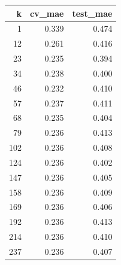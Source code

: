 \begin{tabular}{rrr}
\toprule
k & cv_mae & test_mae \\
\midrule
1 & 0.339 & 0.474 \\
12 & 0.261 & 0.416 \\
23 & 0.235 & 0.394 \\
34 & 0.238 & 0.400 \\
46 & 0.232 & 0.410 \\
57 & 0.237 & 0.411 \\
68 & 0.235 & 0.404 \\
79 & 0.236 & 0.413 \\
102 & 0.236 & 0.408 \\
124 & 0.236 & 0.402 \\
147 & 0.236 & 0.405 \\
158 & 0.236 & 0.409 \\
169 & 0.236 & 0.406 \\
192 & 0.236 & 0.413 \\
214 & 0.236 & 0.410 \\
237 & 0.236 & 0.407 \\
\bottomrule
\end{tabular}
